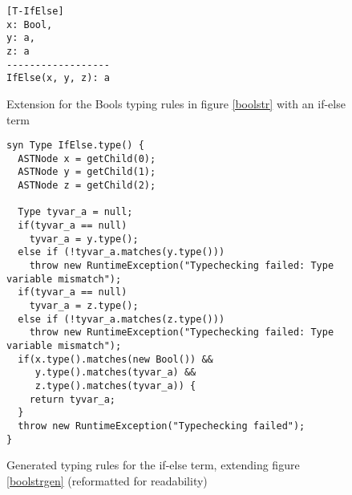 \documentclass[nofilelist]{cslthse-msc}
\begin{document}
\begin{figure}[h]
\begin{lstlisting}[]
[T-IfElse]
x: Bool,
y: a,
z: a
------------------
IfElse(x, y, z): a
\end{lstlisting}
  \caption{Extension for the Bools typing rules in figure \ref{boolstr} with an if-else term}
  \label{ifelsetr}
\end{figure}
\begin{figure}[h]
\begin{lstlisting}[language=jrag]
syn Type IfElse.type() {
  ASTNode x = getChild(0);
  ASTNode y = getChild(1);
  ASTNode z = getChild(2);

  Type tyvar_a = null;
  if(tyvar_a == null)
    tyvar_a = y.type();
  else if (!tyvar_a.matches(y.type()))
    throw new RuntimeException("Typechecking failed: Type variable mismatch");
  if(tyvar_a == null)
    tyvar_a = z.type();
  else if (!tyvar_a.matches(z.type()))
    throw new RuntimeException("Typechecking failed: Type variable mismatch");
  if(x.type().matches(new Bool()) &&
     y.type().matches(tyvar_a) &&
     z.type().matches(tyvar_a)) {
    return tyvar_a;
  }
  throw new RuntimeException("Typechecking failed");
}
\end{lstlisting}
  \caption{Generated typing rules for the if-else term, extending figure \ref{boolstrgen} (reformatted for readability)}
  \label{ifelsetrgen}
\end{figure}
\end{document}
